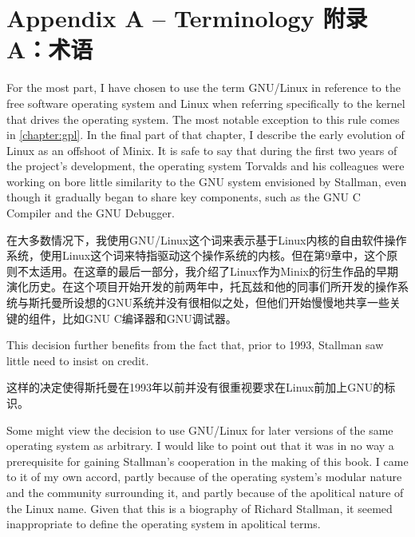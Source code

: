 

\chapter{\ifdefined\eng
Appendix A -- Terminology
\fi
\ifdefined\chs
附录A：术语
\fi
}
\thispagestyle{empty}
\ifdefined\eng
For the most part, I have chosen to use the term GNU/Linux in reference to the free software operating system and Linux when referring specifically to the kernel that drives the operating system. The most notable exception to this rule comes in \autoref{chapter:gpl}. In the final part of that chapter, I describe the early evolution of Linux as an offshoot of Minix. It is safe to say that during the first two years of the project's development, the operating system Torvalds and his colleagues were working on bore little similarity to the GNU system envisioned by Stallman, even though it gradually began to share key components, such as the GNU C Compiler and the GNU Debugger.
\fi

\ifdefined\chs
在大多数情况下，我使用GNU/Linux这个词来表示基于Linux内核的自由软件操作系统，使用Linux这个词来特指驱动这个操作系统的内核。但在第9章中，这个原则不太适用。在这章的最后一部分，我介绍了Linux作为Minix的衍生作品的早期演化历史。在这个项目开始开发的前两年中，托瓦兹和他的同事们所开发的操作系统与斯托曼所设想的GNU系统并没有很相似之处，但他们开始慢慢地共享一些关键的组件，比如GNU C编译器和GNU调试器。
\fi

\ifdefined\eng
This decision further benefits from the fact that, prior to 1993, Stallman saw little need to insist on credit.
\fi

\ifdefined\chs
这样的决定使得斯托曼在1993年以前并没有很重视要求在Linux前加上GNU的标识。
\fi

\ifdefined\eng
Some might view the decision to use GNU/Linux for later versions of the same operating system as arbitrary. I would like to point out that it was in no way a prerequisite for gaining Stallman's cooperation in the making of this book. I came to it of my own accord, partly because of the operating system's modular nature and the community surrounding it, and partly because of the apolitical nature of the Linux name. Given that this is a biography of Richard Stallman, it seemed inappropriate to define the operating system in apolitical terms.
\fi

